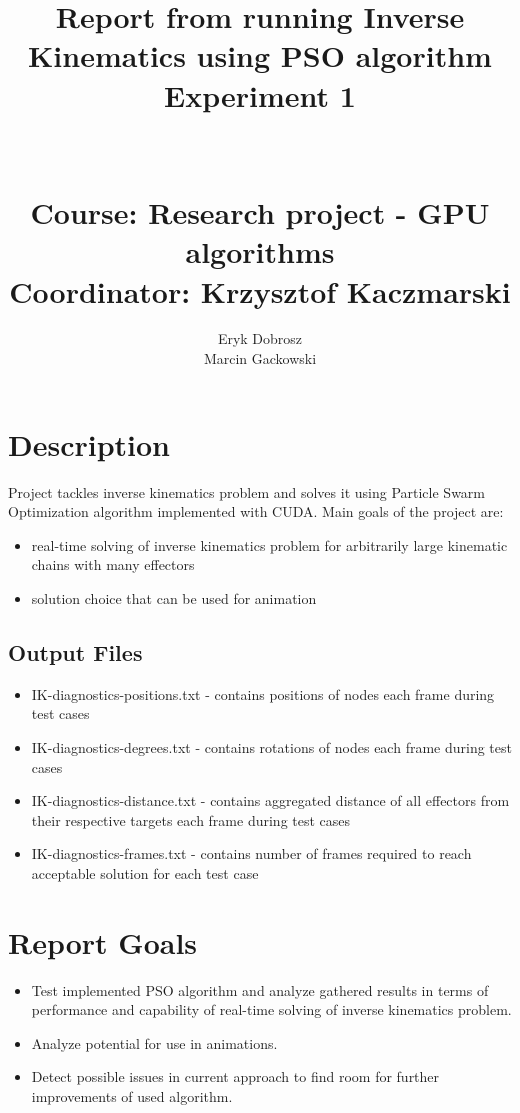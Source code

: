 \documentclass[]{report}
\begin{document}
\title{Report from running Inverse Kinematics using PSO algorithm \\
\large Experiment 1 \\~\\~\\
\large Course: Research project - GPU algorithms \\
\large Coordinator: Krzysztof Kaczmarski }
\author{Eryk Dobrosz \\
	Marcin Gackowski}

{\let\newpage\relax\maketitle}

\chapter*{Description}
Project tackles inverse kinematics problem and solves it using Particle Swarm Optimization algorithm implemented with CUDA. Main goals of the project are:

\begin{itemize}
	\item real-time solving of inverse kinematics problem for arbitrarily large kinematic chains with many effectors
	\item solution choice that can be used for animation
\end{itemize}

\section*{Output Files}
\begin{itemize}
\item IK-diagnostics-positions.txt - contains positions of nodes each frame during test cases
\item IK-diagnostics-degrees.txt - contains rotations of nodes each frame during test cases
\item IK-diagnostics-distance.txt - contains aggregated distance of all effectors from their respective targets each frame during test cases
\item IK-diagnostics-frames.txt - contains number of frames required to reach acceptable solution for each test case
\end{itemize}

\chapter*{Report Goals}
\begin{itemize}
	\item Test implemented PSO algorithm and analyze gathered results in terms of performance and capability of real-time solving of inverse kinematics problem.
	\item Analyze potential for use in animations.
	\item Detect possible issues in current approach to find room for further improvements of used algorithm.
\end{itemize}
\end{document}
